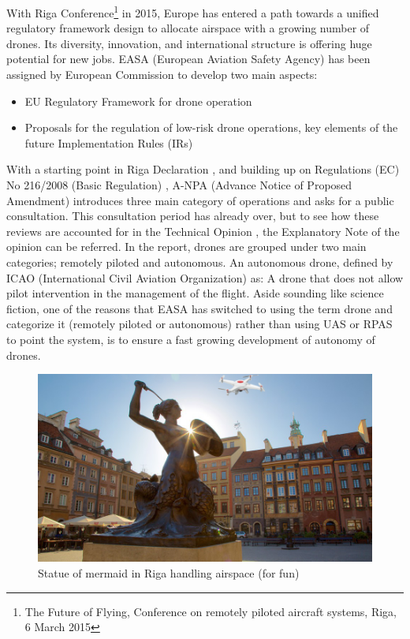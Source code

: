With Riga Conference\footnote{The Future of Flying, Conference on remotely piloted aircraft systems, Riga, 6 March 2015} in 2015, Europe has entered a path towards a unified regulatory framework design to allocate airspace with a growing number of drones. 
Its diversity, innovation, and international structure is offering huge potential for new jobs. 
EASA (European Aviation Safety Agency) has been assigned by European Commission to develop two main aspects:

\begin{itemize}
\item{EU Regulatory Framework for drone operation}
\item{Proposals for the regulation of low-risk drone operations, key elements of the future Implementation Rules (IRs)}
\end{itemize}


With a starting point in Riga Declaration \cite{rigaDeclaration}, and building up on Regulations (EC) No 216/2008 (Basic Regulation) \cite{basicRegulation}, A-NPA (Advance Notice of Proposed Amendment) \cite{A_NPA_EASA2015} introduces three main category of operations and asks for a public consultation. 
This consultation period has already over, but to see how these reviews are accounted for in the Technical Opinion \cite{technicalOpinion}, the Explanatory Note of the opinion can be referred.
In the report, drones are grouped under two main categories; remotely piloted and autonomous. 
An autonomous drone, defined by ICAO (International Civil Aviation Organization) \cite{ICAO_RPASmanuel} as: A drone that does not allow pilot intervention in the management of the flight. 
Aside sounding like science fiction, one of the reasons that EASA has switched to using the term drone and categorize it (remotely piloted or autonomous) rather than using UAS or RPAS to point the system, is to ensure a fast growing development of autonomy of drones.

\begin{figure}
\begin{center}
\includegraphics[width=11.3cm]{figures/mermaid_statue_drone}
\caption{Statue of mermaid in Riga handling airspace (for fun)} 
\label{fig:mermaid_statue_drone}
\end{center}
\end{figure}


